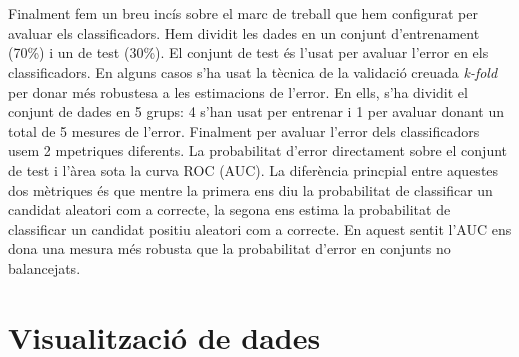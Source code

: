 \documentclass[a4paper,10pt]{article}
\begin{document}
\\
\\
Finalment fem un breu incís sobre el marc de treball que hem configurat per avaluar els classificadors. Hem dividit les dades en un conjunt d'entrenament (70\%) i un de test (30\%). El conjunt de test és l'usat per avaluar l'error en els classificadors. En alguns casos s'ha usat la tècnica de la validació creuada \textit{k-fold} per donar més robustesa a les estimacions de l'error. En ells, s'ha dividit el conjunt de dades en 5 grups: 4 s'han usat per entrenar i 1 per avaluar donant un total de 5 mesures de l'error. Finalment per avaluar l'error dels classificadors usem 2 mpetriques diferents. La probabilitat d'error directament sobre el conjunt de test i l'àrea sota la curva ROC (AUC). La diferència princpial entre aquestes dos mètriques és que mentre la primera ens diu la probabilitat de classificar un candidat aleatori com a correcte, la segona ens estima la probabilitat de classificar un candidat positiu aleatori com a correcte. En aquest sentit l'AUC ens dona una mesura més robusta que la probabilitat d'error en conjunts no balancejats.


\section{Visualització de dades}
\end{document}
